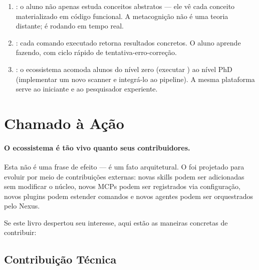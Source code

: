 \begin{enumerate}
    \item {}: o aluno não apenas
    estuda conceitos abstratos --- ele vê cada conceito
    materializado em código funcional. A metacognição não é uma
    teoria distante; é  rodando em
    tempo real.

    \item {}: cada comando executado
    retorna resultados concretos. O aluno aprende fazendo, com
    ciclo rápido de tentativa-erro-correção.

    \item {}: o ecossistema
    acomoda alunos do nível zero (executar ) ao
    nível PhD (implementar um novo scanner e integrá-lo ao
    pipeline). A mesma plataforma serve ao iniciante e ao
    pesquisador experiente.
\end{enumerate}

\section{Chamado à Ação}
\label{sec:chamado-acao}
\nivelzero

\paragraph{O ecossistema é tão vivo quanto seus contribuidores.} Esta
não é uma frase de efeito --- é um fato arquitetural. O \opencodeeco{}
foi projetado para evoluir por meio de contribuições externas: novas
skills podem ser adicionadas sem modificar o núcleo, novos MCPs podem
ser registrados via configuração, novos plugins podem estender
comandos e novos agentes podem ser orquestrados pelo Nexus.

Se este livro despertou seu interesse, aqui estão as maneiras
concretas de contribuir:

\subsection{Contribuição Técnica}

